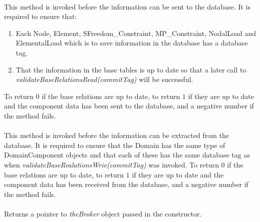 \\
This method is invoked before the information can be sent to the
database. It is required to ensure that: \begin{enumerate} 
\item Each Node, Element, SFreedom\_Constraint, MP\_Constraint, NodalLoad and
ElementalLoad which is to save information in the database has a
database tag.
\item That the information in the base tables is up to date so that a
later call to {\em validateBaseRelationsRead(commitTag)} will be successful.
\end{enumerate}
\noindent To return $0$ if the base relations are up to date, to return
$1$ if they are up to date and the component data has been sent to the
database, and a negative number if the method fails. \\

\\
This method is invoked before the information can be extracted from the
database. It is required to ensure that the Domain has the same
type of DomainComponent objects and that each of these has the same
database tag as when {\em validateBaseRealationsWrie(commitTag)} was
invoked.  To return $0$ if the base relations are up to date, to return
$1$ if they are up to date and the component data has been received from the
database, and a negative number if the method fails. \\

\\
Returns a pointer to {\em theBroker} object passed in the constructor. 
